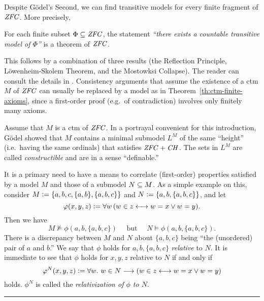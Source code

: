Despite G\"odel's Second, we can find transitive models for every
finite fragment of $\mathit{ZFC}$. More precisely, 
%
\begin{theorem}\label{th:ctm-finite-axioms}
  For each finite subset
  $\Phi\subseteq \mathit{ZFC}$, the statement \emph{``there exists a countable
  transitive model of $\Phi$''} is a theorem of $\mathit{ZFC}$.
\end{theorem}
%
This follows by a
combination of three results (the Reflection Principle,
L\"owenheim-Skolem Theorem, and the Mostowksi Collapse). The reader
can consult the details in \cite{kunen2011set}. Consistency arguments that assume
the existence of a ctm $M$ of $\mathit{ZFC}$ can usually be replaced by a
model as in Theorem~\ref{th:ctm-finite-axioms}, since a first-order
proof (e.g.\ of contradiction) involves only finitely many axioms.

Assume that $M$ is a ctm of $\mathit{ZFC}$. In a portrayal convenient for this
introduction, G\"odel showed that $M$ contains a minimal submodel
$L^M$ of the same ``height'' (i.e.\ having the same ordinals)
that satisfies $\mathit{ZFC}+\mathit{CH}$. The sets in $L^M$ are called
\emph{constructible} and are in a sense ``definable.''

It is a primary need to have a means to correlate  (first-order)
properties satisfied by a model $M$ and those of a 
submodel $N\subseteq M$. As a simple example on this, consider 
$M\mathrel{\mathop:}= \{a,b,c, \{a,b\},\{a,b,c\}\}$ and
$N\mathrel{\mathop:}=\{a,b,\{a,b,c\}\}$, and let 
\[
\varphi(x,y,z)\mathrel{\mathop:}= \forall w \,( w\in z \longleftrightarrow w=x \vee w=y).
\]
Then we have
\[
M\not\models \phi(a,b,\{a,b,c\}) \quad\text{ but }\quad N\models \phi(a,b,\{a,b,c\}).
\]
There is a discrepancy between  $M$ and $N$ about $\{a,b,c\}$ being ``the
(unordered) pair of $a$ and $b$.'' We say that $\phi$ holds for
$a,b,\{a,b,c\}$ \emph{relative} to $N$. It is immediate to see that
$\phi$ holds  for $x,y,z$ relative to $N$ if and only if
\[
\varphi^N(x,y,z)\mathrel{\mathop:}= \forall w.\ w\in N\longrightarrow ( w\in z \longleftrightarrow w=x \vee w=y)
\] 
holds. $\phi^N$ is called the \emph{relativization of $\phi$ to
  $N$}. 
\bigskip

\hrule
\bigskip

